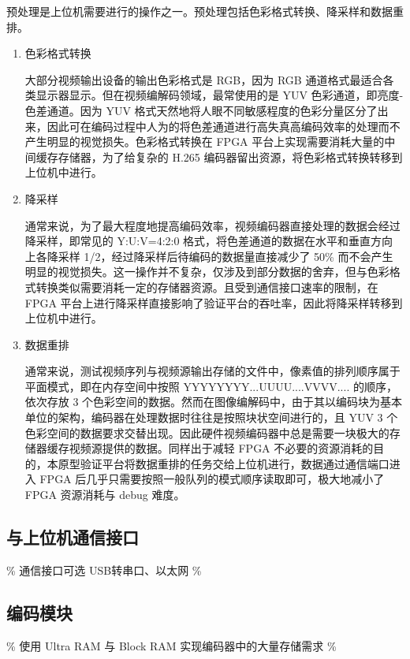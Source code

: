 预处理是上位机需要进行的操作之一。预处理包括色彩格式转换、降采样和数据重排。
\begin{enumerate}
    \item 色彩格式转换

          大部分视频输出设备的输出色彩格式是 RGB，因为 RGB 通道格式最适合各类显示器显示。但在视频编解码领域，最常使用的是 YUV 色彩通道，即亮度-色差通道。因为 YUV 格式天然地将人眼不同敏感程度的色彩分量区分了出来，因此可在编码过程中人为的将色差通道进行高失真高编码效率的处理而不产生明显的视觉损失。色彩格式转换在 FPGA 平台上实现需要消耗大量的中间缓存存储器，为了给复杂的 H.265 编码器留出资源，将色彩格式转换转移到上位机中进行。

    \item 降采样

          通常来说，为了最大程度地提高编码效率，视频编码器直接处理的数据会经过降采样，即常见的 Y:U:V=4:2:0 格式，将色差通道的数据在水平和垂直方向上各降采样 1/2，经过降采样后待编码的数据量直接减少了 50\% 而不会产生明显的视觉损失。这一操作并不复杂，仅涉及到部分数据的舍弃，但与色彩格式转换类似需要消耗一定的存储器资源。且受到通信接口速率的限制，在 FPGA 平台上进行降采样直接影响了验证平台的吞吐率，因此将降采样转移到上位机中进行。

    \item 数据重排

          通常来说，测试视频序列与视频源输出存储的文件中，像素值的排列顺序属于平面模式，即在内存空间中按照 YYYYYYYY...UUUU....VVVV.... 的顺序，依次存放 3 个色彩空间的数据。然而在图像编解码中，由于其以编码块为基本单位的架构，编码器在处理数据时往往是按照块状空间进行的，且 YUV 3 个色彩空间的数据要求交替出现。因此硬件视频编码器中总是需要一块极大的存储器缓存视频源提供的数据。同样出于减轻 FPGA 不必要的资源消耗的目的，本原型验证平台将数据重排的任务交给上位机进行，数据通过通信端口进入 FPGA 后几乎只需要按照一般队列的模式顺序读取即可，极大地减小了 FPGA 资源消耗与 debug 难度。


\end{enumerate}

\subsection{与上位机通信接口}
\% 通信接口可选 USB转串口、以太网 \%

\subsection{编码模块}
\% 使用 Ultra RAM 与 Block RAM 实现编码器中的大量存储需求 \%

